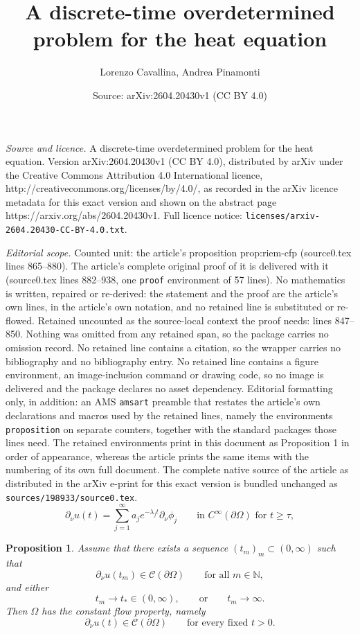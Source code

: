 \documentclass[10pt,a4paper]{amsart}
\title{A discrete-time overdetermined problem for the heat equation}
\author{Lorenzo Cavallina, Andrea Pinamonti}
\date{Source: arXiv:2604.20430v1 (CC BY 4.0)}
\newtheorem{proposition}{Proposition}
\begin{document}
\maketitle

\noindent\emph{Source and licence.} A discrete-time overdetermined problem for the heat equation. Version arXiv:2604.20430v1 (CC BY 4.0), distributed by arXiv under the Creative Commons Attribution 4.0 International licence, http://creativecommons.org/licenses/by/4.0/, as recorded in the arXiv licence metadata for this exact version and shown on the abstract page https://arxiv.org/abs/2604.20430v1. Full licence notice: \texttt{licenses/arxiv-2604.20430-CC-BY-4.0.txt}.\par\smallskip

\noindent\textit{Editorial scope.} Counted unit: the article's proposition prop:riem-cfp (source0.tex lines 865--880). The article's complete original proof of it is delivered with it (source0.tex lines 882--938, one \texttt{proof} environment of 57 lines). No mathematics is written, repaired or re-derived: the statement and the proof are the article's own lines, in the article's own notation, and no retained line is substituted or re-flowed.  Retained uncounted as the source-local context the proof needs: lines 847--850.  Nothing was omitted from any retained span, so the package carries no omission record.  No retained line contains a citation, so the wrapper carries no bibliography and no bibliography entry.  No retained line contains a figure environment, an image-inclusion command or drawing code, so no image is delivered and the package declares no asset dependency.  Editorial formatting only, in addition: an AMS \texttt{amsart} preamble that restates the article's own declarations and macros used by the retained lines, namely the environments \texttt{proposition} on separate counters, together with the standard packages those lines need.  The retained environments print in this document as Proposition 1 in order of appearance, whereas the article prints the same items with the numbering of its own full document.  The complete native source of the article as distributed in the arXiv e-print for this exact version is bundled unchanged as \texttt{sources/198933/source0.tex}.
\begin{equation}\label{eq:spectral-du}
\partial_\nu u(t)=\sum_{j=1}^\infty a_j e^{-\lambda_j t}\partial_\nu\phi_j
\qquad\text{in }C^\infty(\partial\Omega)\text{ for }t\geq \tau,
\end{equation}

\begin{proposition}\label{prop:riem-cfp}
Assume that there exists a sequence $(t_m)_m\subset (0,\infty)$ such that
\[
\partial_\nu u(t_m)\in \mathcal C(\partial\Omega)\qquad\text{for all }m\in\mathbb{N},
\]
and either
\[
t_m\to t_\ast\in (0,\infty),
\qquad\text{or}\qquad
t_m\to \infty.
\]
Then $\Omega$ has the \emph{constant flow property}, namely
\[
\partial_\nu u(t)\in \mathcal C(\partial\Omega)\qquad\text{for every fixed }t>0.
\]
\end{proposition}
\end{document}
